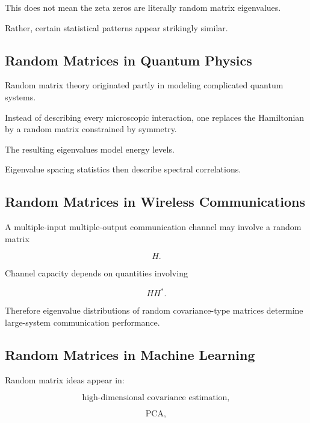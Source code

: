This does not mean the zeta zeros are literally random matrix
eigenvalues.

Rather, certain statistical patterns appear strikingly similar.

\subsection{Random Matrices in Quantum Physics}
\label{subsec:rmt-quantum-physics}

Random matrix theory originated partly in modeling complicated quantum
systems.

Instead of describing every microscopic interaction, one replaces the
Hamiltonian by a random matrix constrained by symmetry.

The resulting eigenvalues model energy levels.

Eigenvalue spacing statistics then describe spectral correlations.

\subsection{Random Matrices in Wireless Communications}
\label{subsec:rmt-wireless}

A multiple-input multiple-output communication channel may involve a
random matrix

\[
H.
\]

Channel capacity depends on quantities involving

\[
HH^*.
\]

Therefore eigenvalue distributions of random covariance-type matrices
determine large-system communication performance.

\subsection{Random Matrices in Machine Learning}
\label{subsec:rmt-machine-learning}

Random matrix ideas appear in:

\[
\boxed{
\text{high-dimensional covariance estimation},
}
\]

\[
\boxed{
\text{PCA},
}
\]

